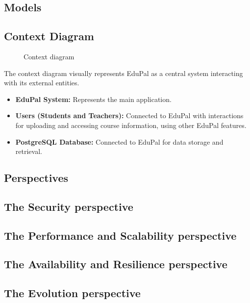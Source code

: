 \subsection{Models}
\subsection*{Context Diagram}

\begin{figure}[H]
    \caption{Context diagram}
    \label{context-view-context-diagram}
\end{figure}

The context diagram visually represents EduPal as a central system interacting with its external entities.

\begin{itemize}
    \item \textbf{EduPal System:} Represents the main application.
    \item \textbf{Users (Students and Teachers):} Connected to EduPal with interactions for uploading and accessing course information, using other EduPal features.
    \item \textbf{PostgreSQL Database:} Connected to EduPal for data storage and retrieval.
\end{itemize}

\subsection{Perspectives}

\subsection*{The Security perspective}

\subsection*{The Performance and Scalability perspective}

\subsection*{The Availability and Resilience perspective}

\subsection*{The Evolution perspective}

